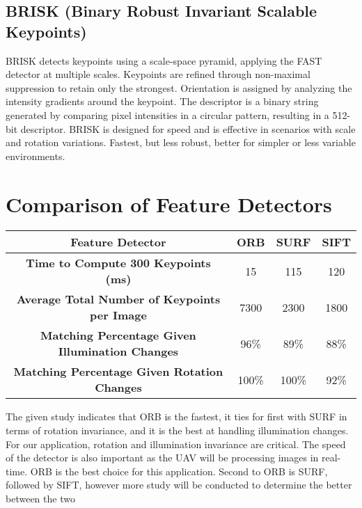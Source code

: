 \subsection*{BRISK (Binary Robust Invariant Scalable Keypoints)}
BRISK detects keypoints using a scale-space pyramid, applying the FAST detector at multiple scales. Keypoints are refined through non-maximal suppression to retain only the strongest. Orientation is assigned by analyzing the intensity gradients around the keypoint. The descriptor is a binary string generated by comparing pixel intensities in a circular pattern, resulting in a 512-bit descriptor. BRISK is designed for speed and is effective in scenarios with scale and rotation variations.
Fastest, but less robust, better for simpler or less variable environments.










\section*{Comparison of Feature Detectors} 




\begin{table}[H]
\centering
\begin{tabular}{|c|c|c|c|}
\hline
\textbf{Feature Detector} & \textbf{ORB} & \textbf{SURF} & \textbf{SIFT} \\ \hline
\textbf{Time to Compute 300 Keypoints (ms)} & 15 & 115 & 120 \\ \hline
\textbf{Average Total Number of Keypoints per Image} & 7300 & 2300 & 1800 \\ \hline
\textbf{Matching Percentage Given Illumination Changes} & 96\% & 89\% & 88\% \\ \hline
\textbf{Matching Percentage Given Rotation Changes} & 100\% & 100\% & 92\% \\ \hline
\end{tabular}
\end{table}

The given study indicates that ORB is the fastest, it ties for first with SURF in terms of rotation invariance, and it is the best at handling illumination changes. For our application, rotation and illumination invariance are critical. The speed of the detector is also important as the UAV will be processing images in real-time. ORB is the best choice for this application. Second to ORB is SURF, followed by SIFT, however more study will be conducted to determine the better between the two



